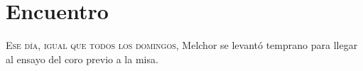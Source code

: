 

\chapter{Encuentro}
\lettrine{E}{se día, igual que todos los domingos,} Melchor se levantó temprano para llegar al ensayo del coro previo a la misa.










